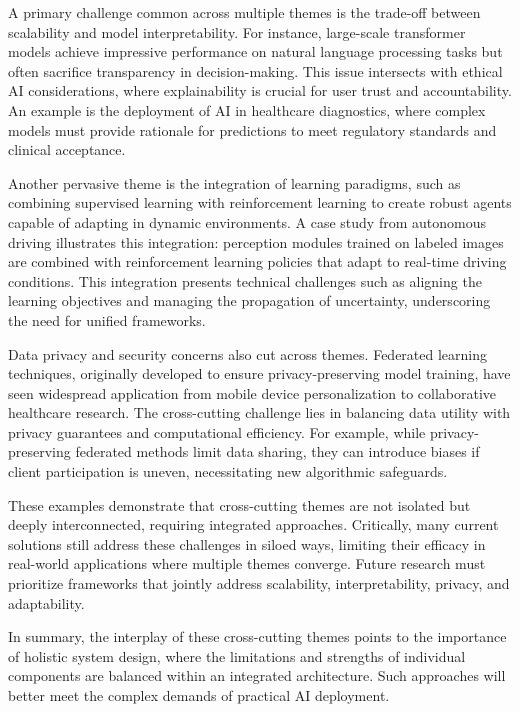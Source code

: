\documentclass[sigconf]{acmart}
\begin{document}
A primary challenge common across multiple themes is the trade-off between scalability and model interpretability. For instance, large-scale transformer models achieve impressive performance on natural language processing tasks but often sacrifice transparency in decision-making. This issue intersects with ethical AI considerations, where explainability is crucial for user trust and accountability. An example is the deployment of AI in healthcare diagnostics, where complex models must provide rationale for predictions to meet regulatory standards and clinical acceptance.

Another pervasive theme is the integration of learning paradigms, such as combining supervised learning with reinforcement learning to create robust agents capable of adapting in dynamic environments. A case study from autonomous driving illustrates this integration: perception modules trained on labeled images are combined with reinforcement learning policies that adapt to real-time driving conditions. This integration presents technical challenges such as aligning the learning objectives and managing the propagation of uncertainty, underscoring the need for unified frameworks.

Data privacy and security concerns also cut across themes. Federated learning techniques, originally developed to ensure privacy-preserving model training, have seen widespread application from mobile device personalization to collaborative healthcare research. The cross-cutting challenge lies in balancing data utility with privacy guarantees and computational efficiency. For example, while privacy-preserving federated methods limit data sharing, they can introduce biases if client participation is uneven, necessitating new algorithmic safeguards.

These examples demonstrate that cross-cutting themes are not isolated but deeply interconnected, requiring integrated approaches. Critically, many current solutions still address these challenges in siloed ways, limiting their efficacy in real-world applications where multiple themes converge. Future research must prioritize frameworks that jointly address scalability, interpretability, privacy, and adaptability.

In summary, the interplay of these cross-cutting themes points to the importance of holistic system design, where the limitations and strengths of individual components are balanced within an integrated architecture. Such approaches will better meet the complex demands of practical AI deployment.
\end{document}
